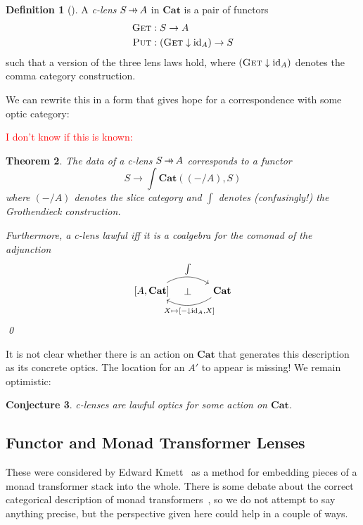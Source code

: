 \documentclass[11pt,letterpaper]{article}
\theoremstyle{plain}
\newtheorem{theorem}{Theorem}[subsection]
\newtheorem{conjecture}[theorem]{Conjecture}
\theoremstyle{definition}
\newtheorem{definition}[theorem]{Definition}
\newcommand{\Cat}{\mathbf{Cat}}
\newcommand{\id}{\mathrm{id}}
\newcommand{\fget}{\textsc{Get}}
\newcommand{\fput}{\textsc{Put}}
\newcommand{\hto}{\ensuremath{\,\mathaccent\shortmid\rightarrow\,}}
\newcommand{\todo}[1]{\textcolor{red}{\small #1}}
\begin{document}
\begin{definition}[{\cite[Definition 4.1]{LensesFibrationsAndUniversalTranslations}}]
A \emph{c-lens} $S \hto A$ in $\Cat$ is a pair of functors 
\begin{align*}
\fget &: S \to A \\
\fput &: (\fget \downarrow \id_{A}) \to S
\end{align*}
such that a version of the three lens laws hold, where $(\fget \downarrow \id_{A})$ denotes the comma category construction. 
\end{definition}

We can rewrite this in a form that gives hope for a correspondence with some optic category:

\todo{I don't know if this is known:}
\begin{theorem}
The data of a c-lens $S \hto A$ corresponds to a functor \[ S \to \int \Cat ((- / A), S) \] where $(-/A)$ denotes the slice category and $\int$ denotes (confusingly!) the Grothendieck construction.

Furthermore, a c-lens lawful iff it is a coalgebra for the comonad of the adjunction
\[
\begin{tikzcd}[column sep = large]
{[A, \Cat]} \ar[r, bend left, "\int"] \ar[r, phantom, "\bot" pos = 0.4] & \Cat \ar[l, bend left, "{X \mapsto [- \downarrow \id_A, X]}" below]
\end{tikzcd}
\]
\qed
\end{theorem}

It is not clear whether there is an action on $\Cat$ that generates this description as its concrete optics. The location for an $A'$ to appear is missing! We remain optimistic:

\begin{conjecture}
c-lenses are lawful optics for some action on $\Cat$.
\end{conjecture}

\subsection{Functor and Monad Transformer Lenses} 
These were considered by Edward Kmett~\cite{MonadTransformerLensesTalk}  as a method for embedding pieces of a monad transformer stack into the whole. There is some debate about the correct categorical description of monad transformers~\cite{MonadTransformersAsMonoidTransformers, CalculatingMonadTransformersCategoryTheory}, so we do not attempt to say anything precise, but the perspective given here could help in a couple of ways.
\end{document}
